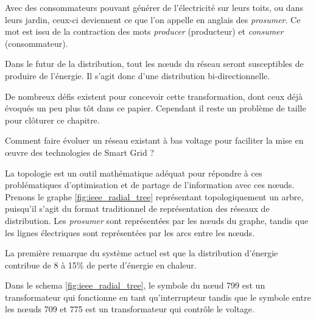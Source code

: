 Avec des consommateurs pouvant générer de l'électricité sur leurs toits, ou dans leurs jardin,
ceux-ci deviennent ce que l'on appelle en anglais des \textit{prosumer}.
Ce mot est issu de la contraction des mots \textit{producer} (producteur) et
\textit{consumer} (consommateur).

Dans le futur de la distribution, tout les nœuds du réseau seront susceptibles de produire de l'énergie.
Il s'agit donc d'une distribution bi-directionnelle.

De nombreux défis existent pour concevoir cette transformation, dont ceux déjà évoqués un peu plus tôt dans ce papier.
Cependant il reste un problème de taille pour clôturer ce chapitre.

Comment faire évoluer un réseau existant à bas voltage pour faciliter la mise en œuvre des technologies
de Smart Grid ?

La topologie est un outil mathématique adéquat pour répondre à ces problématiques d'optimisation
et de partage de l'information avec ces nœuds.
Prenons le graphe \ref{fig:ieee_radial_tree} représentant topologiquement un arbre,
puisqu'il s'agit du format traditionnel de représentation des réseaux de distribution.
Les \textit{prosumer} sont représentées par les nœuds du graphe,
tandis que les lignes électriques sont représentées par les arcs entre les nœuds.

La première remarque du système actuel est que la distribution d'énergie contribue de 8 à 15\% de perte
d'énergie en chaleur.

Dans le schema \ref{fig:ieee_radial_tree}, le symbole du nœud 799 est un transformateur qui
fonctionne en tant qu'interrupteur tandis que le symbole entre les nœuds
709 et 775 est un transformateur qui contrôle le voltage.

